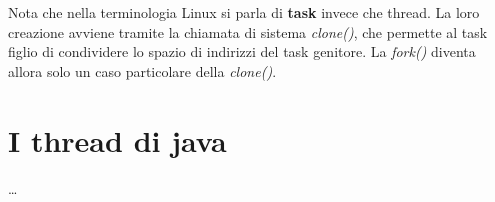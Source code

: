 Nota che nella terminologia Linux si parla di \textbf{task} invece che thread. La loro creazione avviene tramite la chiamata di sistema \textit{clone()}, che permette al task figlio di condividere lo spazio di indirizzi del task genitore. La \textit{fork()} diventa allora solo un caso particolare della \textit{clone()}.

\section{I thread di java}

\dots